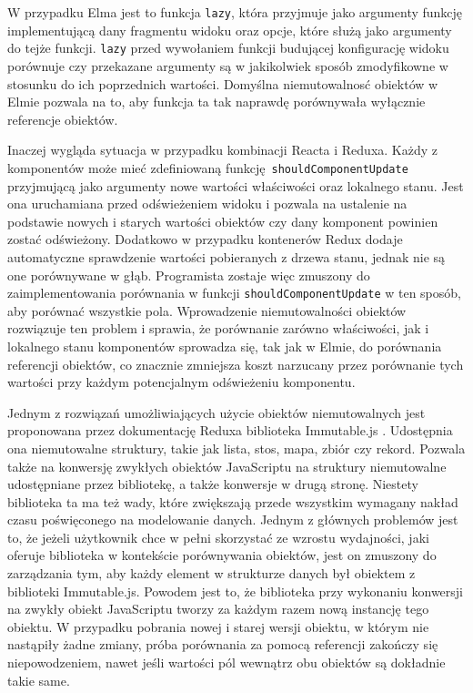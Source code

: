W przypadku Elma jest to funkcja \lstinline{lazy}, która przyjmuje jako argumenty funkcję implementującą dany fragmentu widoku oraz opcje, które służą jako argumenty do tejże funkcji. \lstinline{lazy} przed wywołaniem funkcji budującej konfigurację widoku porównuje czy przekazane argumenty są w jakikolwiek sposób zmodyfikowne w stosunku do ich poprzednich wartości. Domyślna niemutowalnosć obiektów w Elmie pozwala na to, aby funkcja ta tak naprawdę porównywała wyłącznie referencje obiektów.

Inaczej wygląda sytuacja w przypadku kombinacji Reacta i Reduxa. Każdy z komponentów może mieć zdefiniowaną funkcję \lstinline{shouldComponentUpdate} przyjmującą jako argumenty nowe wartości właściwości oraz lokalnego stanu. Jest ona uruchamiana przed odświeżeniem widoku i pozwala na ustalenie na podstawie nowych i starych wartości obiektów czy dany komponent powinien zostać odświeżony. Dodatkowo w przypadku kontenerów Redux dodaje automatyczne sprawdzenie wartości pobieranych z drzewa stanu, jednak nie są one porównywane w głąb. Programista zostaje więc zmuszony do zaimplementowania porównania w funkcji \lstinline{shouldComponentUpdate} w ten sposób, aby porównać wszystkie pola. Wprowadzenie niemutowalności obiektów rozwiązuje ten problem i sprawia, że porównanie zarówno właściwości, jak i lokalnego stanu komponentów sprowadza się, tak jak w Elmie, do porównania referencji obiektów, co znacznie zmniejsza koszt narzucany przez porównanie tych wartości przy każdym potencjalnym odświeżeniu komponentu.

Jednym z rozwiązań umożliwiających użycie obiektów niemutowalnych jest proponowana przez dokumentację Reduxa biblioteka Immutable.js \cite{reduxDocs}. Udostępnia ona niemutowalne struktury, takie jak lista, stos, mapa, zbiór czy rekord. Pozwala także na konwersję zwykłych obiektów JavaScriptu na struktury niemutowalne udostępniane przez bibliotekę, a także konwersje w drugą stronę. Niestety biblioteka ta ma też wady, które zwiększają przede wszystkim wymagany nakład czasu poświęconego na modelowanie danych. Jednym z głównych problemów jest to, że jeżeli użytkownik chce w pełni skorzystać ze wzrostu wydajności, jaki oferuje biblioteka w kontekście porównywania obiektów, jest on zmuszony do zarządzania tym, aby każdy element w strukturze danych był obiektem z biblioteki Immutable.js. Powodem jest to, że biblioteka przy wykonaniu konwersji na zwykły obiekt JavaScriptu tworzy za każdym razem nową instancję tego obiektu. W przypadku pobrania nowej i starej wersji obiektu, w którym nie nastąpiły żadne zmiany, próba porównania za pomocą referencji zakończy się niepowodzeniem, nawet jeśli wartości pól wewnątrz obu obiektów są dokładnie takie same.

